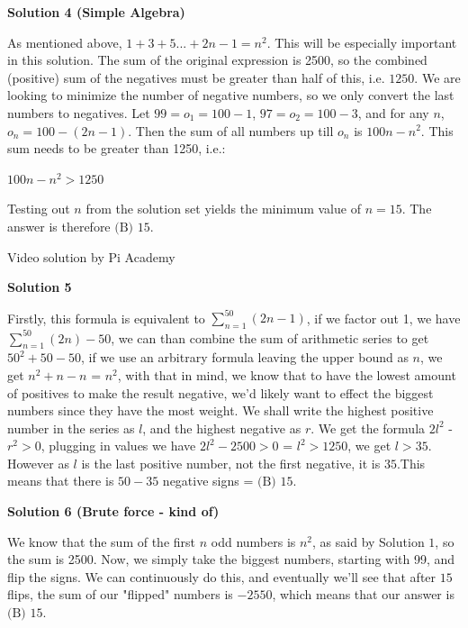 \begin{enumerate}
 



\textbf{Solution 4 (Simple Algebra)}

As mentioned above, $1 + 3 + 5... + 2n - 1 = n^{2}$. This will be especially important in this solution. The sum of the original expression is 2500, so the combined (positive) sum of the negatives must be greater than half of this, i.e. $1250$. We are looking to minimize the number of negative numbers, so we only convert the last numbers to negatives. Let $99 = o_1 = 100-1$, $97 = o_2 = 100 - 3$, and for any $n$, $o_n = 100-(2n-1)$. Then the sum of all numbers up till $o_n$ is $100n - n^{2}$. This sum needs to be greater than 1250, i.e.:

 $100n-n^{2} > 1250$

 Testing out $n$ from the solution set yields the minimum value of $n=15$. The answer is therefore $\boxed{\text{(B) }15}$.

 Video solution by Pi Academy

 



\textbf{Solution 5}

Firstly, this formula is equivalent to $\sum_{n=1}^{50}\left(2n-1\right)$, if we factor out 1, we have $\sum_{n=1}^{50}\left(2n\right) - 50$, we can than combine the sum of arithmetic series to get $50^{2}+50-50$, if we use an arbitrary formula leaving the upper bound as $n$, we get $n^{2}+n-n$ = $n^{2}$, with that in mind, we know that to have the lowest amount of positives to make the result negative, we'd likely want to effect the biggest numbers since they have the most weight. We shall write the highest positive number in the series as $l$, and the highest negative as $r$. We get the formula $2l^{2}$ - $r^{2} > 0$, plugging in values we have $2l^{2} - 2500 > 0$ = $l^{2} > 1250$, we get $l > 35$. However as $l$ is the last positive number, not the first negative, it is $35$.This means that there is $50-35$ negative signs = $\boxed{\text{(B) }15}$.

 



\textbf{Solution 6 (Brute force - kind of)}

We know that the sum of the first $n$ odd numbers is $n^2$, as said by Solution $1$, so the sum is 2500. Now, we simply take the biggest numbers, starting with 99, and flip the signs. We can continuously do this, and eventually we'll see that after $15$ flips, the sum of our "flipped" numbers is $-2550$, which means that our answer is $\boxed{\text{(B) }15}$.


\end{enumerate}
